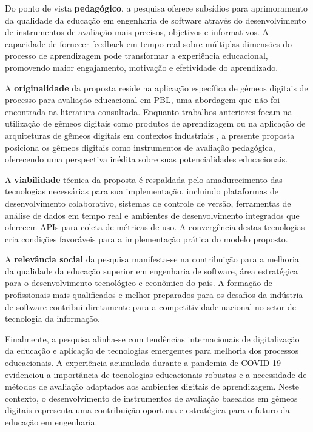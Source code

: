 \documentclass[12pt,a4paper]{article}
\begin{document}
Do ponto de vista \textbf{pedagógico}, a pesquisa oferece subsídios para aprimoramento da qualidade da educação em engenharia de software através do desenvolvimento de instrumentos de avaliação mais precisos, objetivos e informativos. A capacidade de fornecer feedback em tempo real sobre múltiplas dimensões do processo de aprendizagem pode transformar a experiência educacional, promovendo maior engajamento, motivação e efetividade do aprendizado.

A \textbf{originalidade} da proposta reside na aplicação específica de gêmeos digitais de processo para avaliação educacional em PBL, uma abordagem que não foi encontrada na literatura consultada. Enquanto trabalhos anteriores focam na utilização de gêmeos digitais como produtos de aprendizagem \cite{bachmann2023} ou na aplicação de arquiteturas de gêmeos digitais em contextos industriais \cite{arakaki2022}, a presente proposta posiciona os gêmeos digitais como instrumentos de avaliação pedagógica, oferecendo uma perspectiva inédita sobre suas potencialidades educacionais.

A \textbf{viabilidade} técnica da proposta é respaldada pelo amadurecimento das tecnologias necessárias para sua implementação, incluindo plataformas de desenvolvimento colaborativo, sistemas de controle de versão, ferramentas de análise de dados em tempo real e ambientes de desenvolvimento integrados que oferecem APIs para coleta de métricas de uso. A convergência destas tecnologias cria condições favoráveis para a implementação prática do modelo proposto.

A \textbf{relevância social} da pesquisa manifesta-se na contribuição para a melhoria da qualidade da educação superior em engenharia de software, área estratégica para o desenvolvimento tecnológico e econômico do país. A formação de profissionais mais qualificados e melhor preparados para os desafios da indústria de software contribui diretamente para a competitividade nacional no setor de tecnologia da informação.

Finalmente, a pesquisa alinha-se com tendências internacionais de digitalização da educação e aplicação de tecnologias emergentes para melhoria dos processos educacionais. A experiência acumulada durante a pandemia de COVID-19 evidenciou a importância de tecnologias educacionais robustas e a necessidade de métodos de avaliação adaptados aos ambientes digitais de aprendizagem. Neste contexto, o desenvolvimento de instrumentos de avaliação baseados em gêmeos digitais representa uma contribuição oportuna e estratégica para o futuro da educação em engenharia.
\end{document}
